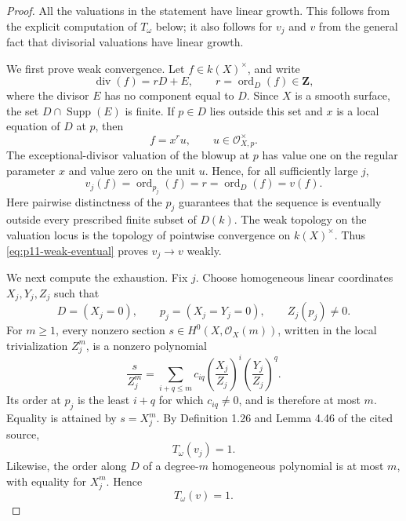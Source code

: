 \begin{proof}
All the valuations in the statement have linear growth.  This follows from
the explicit computation of \(T_\omega\) below; it also follows for
\(v_j\) and \(v\) from the general fact that divisorial valuations have
linear growth.

We first prove weak convergence.  Let \(f\in k(X)^\times\), and write
\[
             \operatorname{div}(f)=rD+E,
             \qquad r=\operatorname{ord}_D(f)\in\mathbf Z,
\]
where the divisor \(E\) has no component equal to \(D\).  Since \(X\) is a
smooth surface, the set \(D\cap\operatorname{Supp}(E)\) is finite.  If
\(p\in D\) lies outside this set and \(x\) is a local equation of \(D\) at
\(p\), then
\[
                         f=x^r u,
                         \qquad u\in\mathcal O_{X,p}^\times.
\]
The exceptional-divisor valuation of the blowup at \(p\) has value one on
the regular parameter \(x\) and value zero on the unit \(u\).  Hence, for
all sufficiently large \(j\),
\[
                  v_j(f)=\operatorname{ord}_{p_j}(f)
                        =r
                        =\operatorname{ord}_D(f)=v(f).
\tag{1}\label{eq:p11-weak-eventual}
\]
Here pairwise distinctness of the \(p_j\) guarantees that the sequence is
eventually outside every prescribed finite subset of \(D(k)\).  The weak
topology on the valuation locus is the topology of pointwise convergence
on \(k(X)^\times\).  Thus \eqref{eq:p11-weak-eventual} proves
\(v_j\to v\) weakly.

We next compute the exhaustion.  Fix \(j\).  Choose homogeneous linear
coordinates \(X_j,Y_j,Z_j\) such that
\[
            D=(X_j=0),\qquad p_j=(X_j=Y_j=0),
            \qquad Z_j(p_j)\ne0.
\]
For \(m\geq1\), every nonzero section
\(s\in H^0(X,\mathcal O_X(m))\), written in the local trivialization
\(Z_j^m\), is a nonzero polynomial
\[
       \frac{s}{Z_j^m}
          =\sum_{i+q\leq m}c_{iq}
             \left(\frac{X_j}{Z_j}\right)^i
             \left(\frac{Y_j}{Z_j}\right)^q.
\tag{2}\label{eq:p11-local-polynomial}
\]
Its order at \(p_j\) is the least \(i+q\) for which \(c_{iq}\ne0\), and
is therefore at most \(m\).  Equality is attained by \(s=X_j^m\).  By
Definition 1.26 and Lemma 4.46 of the cited source,
\[
                         T_\omega(v_j)=1.
\tag{3}\label{eq:p11-T-point}
\]
Likewise, the order along \(D\) of a degree-\(m\) homogeneous polynomial
is at most \(m\), with equality for \(X_j^m\).  Hence
\[
                         T_\omega(v)=1.
\tag{4}\label{eq:p11-T-divisor}
\]


\end{proof}
